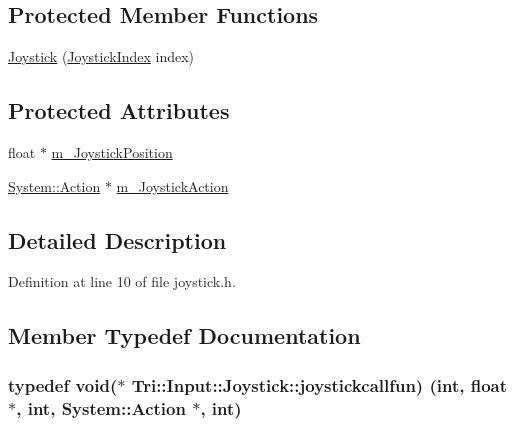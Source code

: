\subsection*{Protected Member Functions}
\begin{DoxyCompactItemize}
\item 
\hyperlink{class_tri_1_1_input_1_1_joystick_a2b9df8a7989454ead020526745d49fdb}{Joystick} (\hyperlink{class_tri_1_1_input_1_1_joystick_ae053177eed8f746c683d7bb9afc8dbb3}{Joystick\+Index} index)
\end{DoxyCompactItemize}
\subsection*{Protected Attributes}
\begin{DoxyCompactItemize}
\item 
float $\ast$ \hyperlink{class_tri_1_1_input_1_1_joystick_a572652754a153f3a63653768d1861c69}{m\+\_\+\+Joystick\+Position}
\item 
\hyperlink{namespace_tri_1_1_input_1_1_system_a79600e9f4ed835251eed1706ce96bed0}{System\+::\+Action} $\ast$ \hyperlink{class_tri_1_1_input_1_1_joystick_a01085701baf18c41dc10f9cf98d84562}{m\+\_\+\+Joystick\+Action}
\end{DoxyCompactItemize}


\subsection{Detailed Description}


Definition at line 10 of file joystick.\+h.



\subsection{Member Typedef Documentation}
\hypertarget{class_tri_1_1_input_1_1_joystick_adb19d991b2b53faf342e4497758d3764}{}
\subsubsection[{joystickcallfun}]{\setlength{\rightskip}{0pt plus 5cm}typedef void($\ast$  Tri\+::\+Input\+::\+Joystick\+::joystickcallfun) (int, float $\ast$, int, {\bf System\+::\+Action} $\ast$, int)}\label{class_tri_1_1_input_1_1_joystick_adb19d991b2b53faf342e4497758d3764}


